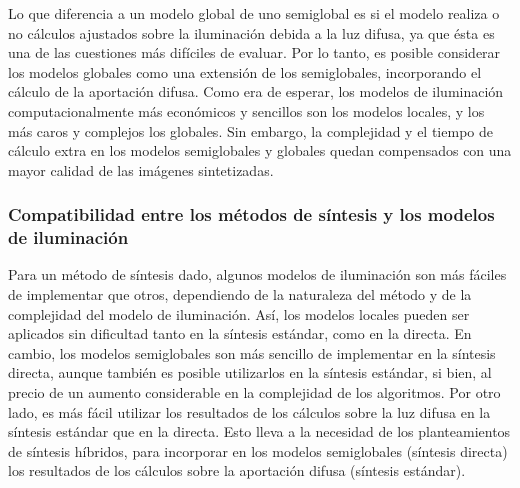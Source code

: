 \begin{description}

Lo que diferencia a un modelo global de uno semiglobal es si el modelo realiza o no cálculos ajustados sobre la iluminación debida a la luz difusa, ya que ésta es una de las cuestiones más difíciles de evaluar. Por lo tanto, es posible considerar los modelos globales como una extensión de los semiglobales, incorporando el cálculo de la aportación difusa.
Como era de esperar, los modelos de iluminación computacionalmente más económicos y sencillos son los modelos locales, y los más caros y complejos los globales. Sin embargo, la complejidad y el tiempo de cálculo extra en los modelos semiglobales y globales quedan compensados con una mayor calidad de las imágenes sintetizadas.
\end{description}

\subsubsection{ Compatibilidad entre los métodos de síntesis y los modelos de iluminación} 
Para un método de síntesis dado, algunos modelos de iluminación son más fáciles de implementar que otros, dependiendo de la naturaleza del método y de la complejidad del modelo de iluminación.
Así, los modelos locales pueden ser aplicados sin dificultad tanto en la síntesis estándar, como en la directa. En cambio, los modelos semiglobales son más sencillo de implementar en la síntesis directa, aunque también es posible utilizarlos en la síntesis estándar, si bien, al precio de un aumento considerable en la complejidad de los algoritmos.
Por otro lado, es más fácil utilizar los resultados de los cálculos sobre la luz difusa en la síntesis estándar que en la directa. Esto lleva a la necesidad de los planteamientos de síntesis híbridos, para incorporar en los modelos semiglobales (síntesis directa) los resultados de los cálculos sobre la aportación difusa (síntesis estándar).

